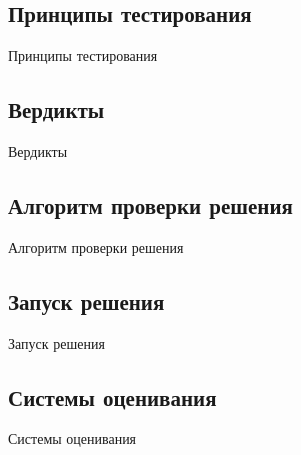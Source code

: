 \subsection*{Принципы тестирования}

Принципы тестирования

\subsection*{Вердикты}

Вердикты

\subsection*{Алгоритм проверки решения}

Алгоритм проверки решения

\subsection*{Запуск решения}

Запуск решения

\subsection*{Системы оценивания}

Системы оценивания